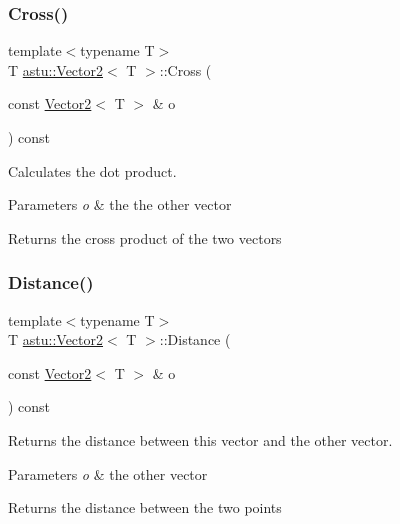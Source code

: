 \subsubsection{\texorpdfstring{Cross()}{Cross()}\hspace{0.1cm}{\footnotesize\ttfamily [2/2]}}
{\footnotesize\ttfamily template$<$typename T$>$ \\
T \hyperlink{classastu_1_1Vector2}{astu\+::\+Vector2}$<$ T $>$\+::Cross (\begin{DoxyParamCaption}\item[{const \hyperlink{classastu_1_1Vector2}{Vector2}$<$ T $>$ \&}]{o }\end{DoxyParamCaption}) const\hspace{0.3cm}{\ttfamily [inline]}}

Calculates the dot product.


\begin{DoxyParams}{Parameters}
{\em o} & the the other vector \\
\hline
\end{DoxyParams}
\begin{DoxyReturn}{Returns}
the cross product of the two vectors 
\end{DoxyReturn}
\mbox{\label{classastu_1_1Vector2_a504029e7043988ec1e697b1a1e2cfb78}} 
\subsubsection{\texorpdfstring{Distance()}{Distance()}}
{\footnotesize\ttfamily template$<$typename T$>$ \\
T \hyperlink{classastu_1_1Vector2}{astu\+::\+Vector2}$<$ T $>$\+::Distance (\begin{DoxyParamCaption}\item[{const \hyperlink{classastu_1_1Vector2}{Vector2}$<$ T $>$ \&}]{o }\end{DoxyParamCaption}) const\hspace{0.3cm}{\ttfamily [inline]}}

Returns the distance between this vector and the other vector.


\begin{DoxyParams}{Parameters}
{\em o} & the other vector \\
\hline
\end{DoxyParams}
\begin{DoxyReturn}{Returns}
the distance between the two points 
\end{DoxyReturn}
\mbox{\label{classastu_1_1Vector2_ac60cbccfefd62216f648c388c5025649}} 
